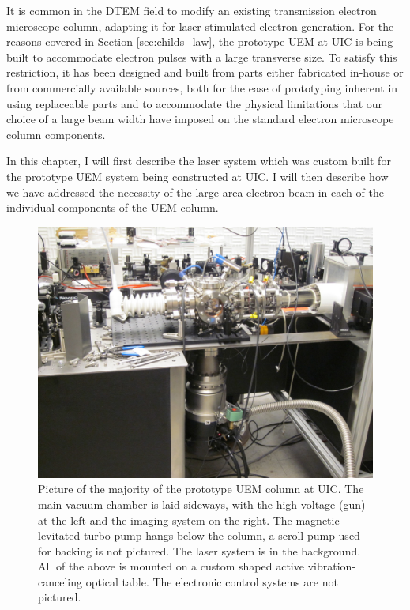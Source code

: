 
It is common in the DTEM field to modify an existing transmission electron microscope column, adapting it for laser-stimulated electron generation.
For the reasons covered in Section \ref{sec:childs_law}, the prototype UEM at UIC is being built to accommodate electron pulses with a large transverse size.
To satisfy this restriction, it has been designed and built from parts either fabricated in-house or from commercially available sources, both for the ease of prototyping inherent in using replaceable parts and to accommodate the physical limitations that our choice of a large beam width have imposed on the standard electron microscope column components.

In this chapter, I will first describe the laser system which was custom built for the prototype UEM system being constructed at UIC.
I will then describe how we have addressed the necessity of the large-area electron beam in each of the individual components of the UEM column.

\begin{figure}
  \centering
  \includegraphics{inc/hardware/column.jpg}
  \caption[Picture of the prototype UEM column at UIC]{
    Picture of the majority of the prototype UEM column at UIC.
    The main vacuum chamber is laid sideways, with the high voltage (gun) at the left and the imaging system on the right.
    The magnetic levitated turbo pump hangs below the column, a scroll pump used for backing is not pictured.
    The laser system is in the background.
    All of the above is mounted on a custom shaped active vibration-canceling optical table.
    The electronic control systems are not pictured.
  }
  \label{fig:column-pic}
\end{figure}



